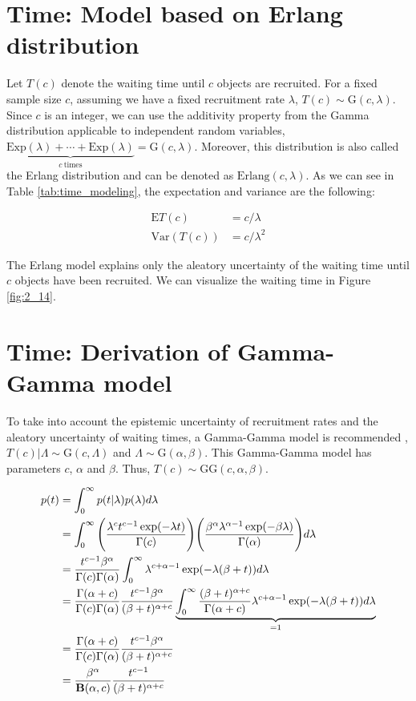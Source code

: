 \section{Time: Model based on Erlang distribution}
Let $T(c)$ denote the waiting time until $c$ objects are recruited. For a fixed sample size $c$, assuming we have a fixed recruitment rate $\lambda$, $T(c)\sim\textrm{G}(c, \lambda)$. Since $c$ is an integer, we can use the additivity property from the Gamma distribution applicable to independent random variables, $\underbrace{\textrm{Exp} (\lambda) +\cdots +\textrm{Exp} (\lambda)}_{c \ \text{times}} = \textrm{G} (c, \lambda)$. Moreover, this distribution is also called the Erlang distribution and can be denoted as $\textrm{Erlang} (c, \lambda)$. As we can see in Table \ref{tab:time_modeling}, the expectation and variance are the following:

\begin{align*}
\textrm{E}T(c) & = c/\lambda\\
\textrm{Var}(T(c)) & = c/\lambda^2
\end{align*}

The Erlang model explains only the aleatory uncertainty of the waiting time until $c$ objects have been recruited. We can visualize the waiting time in Figure \ref{fig:2_14}.

\section{Time: Derivation of Gamma-Gamma model}

To take into account the epistemic uncertainty of recruitment rates and the aleatory uncertainty of waiting times, a Gamma-Gamma model is recommended \citep{bagiella2001predicting}, $T(c)|\Lambda \sim \textrm{G}(c, \Lambda)$ and $\Lambda \sim \textrm{G}(\alpha,\beta)$. This Gamma-Gamma model has parameters $c$, $\alpha$ and $\beta$. Thus, $T(c)\sim \textrm{GG}(c, \alpha, \beta)$.


\begin{align*}
p(t) &= \int_0^{\infty} p(t|\lambda) p(\lambda) d\lambda\\
&= \int_0^{\infty}\Bigg( \frac{\lambda^ct^{c-1}\exp(-\lambda t)}{\Gamma(c)}\Bigg)\Bigg(\frac{\beta^{\alpha}\lambda^{\alpha-1}\exp(-\beta \lambda)}{\Gamma(\alpha)}\Bigg)d\lambda \\
&=\frac{t^{c-1}\beta^{\alpha}}{\Gamma(c)\Gamma(\alpha)}\int_0^{\infty}\lambda^{c+\alpha-1}\exp(-\lambda(\beta+t))d\lambda\\
&=\frac{\Gamma(\alpha+c)}{\Gamma(c)\Gamma(\alpha)}\frac{t^{c-1}\beta^{\alpha}}{(\beta+t)^{\alpha+c}}\underbrace{\int_0^{\infty}\frac{(\beta+t)^{\alpha+c}}{\Gamma(\alpha+c)}\lambda^{c+\alpha-1}\exp(-\lambda(\beta+t))d\lambda}_{=1}\\
&=\frac{\Gamma(\alpha+c)}{\Gamma(c)\Gamma(\alpha)}\frac{t^{c-1}\beta^{\alpha}}{(\beta+t)^{\alpha+c}}\\
&=\frac{\beta^{\alpha}}{{\mathbf{B}}(\alpha, c)}\frac{t^{c-1}}{(\beta+t)^{\alpha+c}}
\end{align*}

